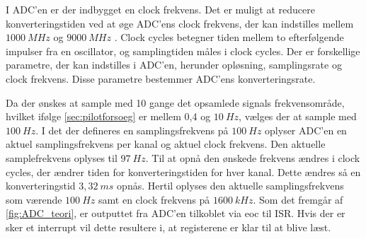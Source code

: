 \noindent
I ADC'en er der indbygget en clock frekvens. Det er muligt at reducere konverteringstiden ved at øge ADC'ens clock frekvens, der kan indstilles mellem $1000~MHz$ og $9000~MHz$ \citep{ADC2014}. Clock cycles betegner tiden mellem to efterfølgende impulser fra en oscillator, og samplingtiden måles i clock cycles. Der er forskellige parametre, der kan indstilles i ADC'en, herunder opløsning, samplingsrate og clock frekvens. Disse parametre bestemmer ADC'ens konverteringsrate. %

Da der ønskes at sample med 10 gange det opsamlede signals frekvensområde, hvilket ifølge \autoref{sec:pilotforsoeg} er mellem 0,4 og $10~Hz$, vælges der at sample med $100~Hz$. 
I det der defineres en samplingsfrekvens på $100~Hz$ oplyser ADC'en en aktuel samplingsfrekvens per kanal og aktuel clock frekvens. Den aktuelle samplefrekvens oplyses til $97~Hz$. Til at opnå den ønskede frekvens ændres i clock cycles, der ændrer tiden for konverteringstiden for hver kanal. Dette ændres så en konverteringstid $3,32~ms$ opnås. Hertil oplyses den aktuelle samplingsfrekvens som værende $100~Hz$ samt en clock frekvens på $1600~kHz$. 
Som det fremgår af \autoref{fig:ADC_teori}, er outputtet fra ADC'en tilkoblet via eoc til ISR. Hvis der er sker et interrupt vil dette resultere i, at registerene er klar til at blive læst\citep{ADC2014}.


